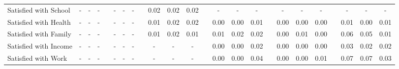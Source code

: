 \begin{center}
{\begin{longtable}{L{12em} c c c p{1.2em} c c c p{1.2em} c c c p{1.2em} c c c p{1.2em} c c c p{1.2em} c c c}
Satisfied with School & - & - & - & & - & - & - & &      0.02 &      0.02 &      0.02 & & - & - & - & & - & - & - & & - & - & - \\[.3em]
Satisfied with Health & - & - & - & & - & - & - & &      0.01 &      0.02 &      0.02 & &      0.00 &      0.00 &      0.01 & &      0.00 &      0.00 &      0.00 & &      0.01 &      0.00 &      0.01 \\[.3em]
Satisfied with Family & - & - & - & & - & - & - & &      0.01 &      0.02 &      0.01 & &      0.01 &      0.02 &      0.02 & &      0.00 &      0.01 &      0.00 & &      0.06 &      0.05 &      0.01 \\[.3em]
Satisfied with Income & - & - & - & & - & - & - & & - & - & - & &      0.00 &      0.00 &      0.02 & &      0.00 &      0.00 &      0.00 & &      0.03 &      0.02 &      0.02 \\[.3em]
Satisfied with Work & - & - & - & & - & - & - & & - & - & - & &      0.00 &      0.00 &      0.04 & &      0.00 &      0.00 &      0.01 & &      0.07 &      0.07 &      0.03 \\[.3em]
\hline
\end{longtable}
}
\end{center}
